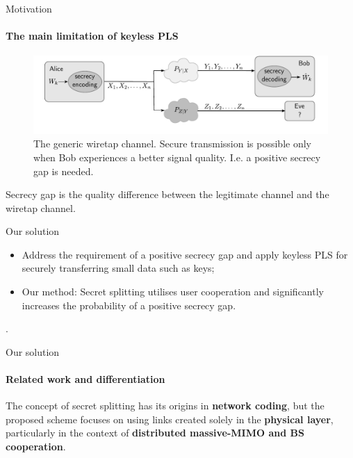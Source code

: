 \begin{frame}{Motivation}
\framesubtitle{The main limitation of keyless PLS}
    
\begin{figure}
\vspace{-1cm}
    \centering
    \includegraphics[scale = 0.65]{slides/figures/WiretapChannelCK.pdf}
    \vspace{-.5cm}
    \caption{The generic wiretap channel. Secure transmission is possible only when Bob experiences a better signal quality. I.e. a positive secrecy gap is needed.}
    \label{fig:CK}
\end{figure}
\vspace{-.5cm}
\begin{definition}
    Secrecy gap is the quality difference between the legitimate channel and the wiretap channel. 
\end{definition}

\end{frame}

\begin{frame}{Our solution}
\begin{itemize}
\item Address the requirement of a positive secrecy gap and apply keyless PLS for securely transferring small data such as keys;
\item Our method: Secret splitting utilises user cooperation and significantly increases the probability of a positive secrecy gap.

\end{itemize}. 
\end{frame}

\begin{frame}{Our solution}
\framesubtitle{Related work and differentiation}
The concept of secret splitting has its origins in \textbf{network coding}, but the proposed scheme focuses on using links created solely in the \textbf{physical layer}, particularly in the context of \textbf{distributed massive-MIMO and BS cooperation}.
    
\end{frame}

